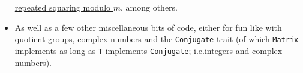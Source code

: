 \documentclass{report}
\begin{document}
\begin{itemize}
        \href{https://docs.rs/num-integer/0.1.44/src/num_integer/lib.rs.html#462}{repeated squaring modulo $m$},
        among others.
    \item As well as a few other miscellaneous bits of code, either
        for fun like with
        \href{https://github.com/nilsso/quadratic-sieve-rs/blob/main/src/quotient_group.rs}{quotient groups},
        \href{https://github.com/nilsso/quadratic-sieve-rs/blob/main/src/complex.rs}{complex numbers} and the
        \href{https://github.com/nilsso/quadratic-sieve-rs/blob/main/src/conjugate.rs}{\Verb!Conjugate! trait}
        (of which \Verb+Matrix+ implements as long as \Verb+T+
        implements \Verb!Conjugate!; i.e.\@ integers and complex numbers).
\end{itemize}
\end{document}
